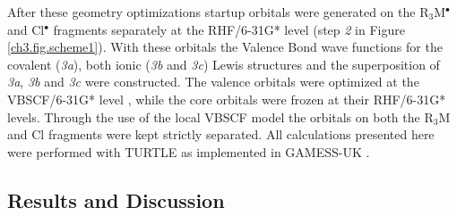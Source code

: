 After these geometry optimizations startup orbitals were generated on the R$_3$M$^{\bullet}$ and Cl$^{\bullet}$ fragments separately at the \mbox{RHF/6-31G*} level (step \textit{2} in Figure \ref{ch3.fig.scheme1}).  With these orbitals the Valence Bond wave functions for the covalent (\textit{3a}), both ionic (\textit{3b} and \textit{3c}) Lewis structures and the superposition of \textit{3a}, \textit{3b} and \textit{3c} were constructed. The valence orbitals were optimized at the \mbox{VBSCF/6-31G*} level \cite{vbscf1,vbscf2}, while the core orbitals were frozen at their \mbox{RHF/6-31G*} levels.
Through the use of the local VBSCF model the orbitals on both the R$_3$M and Cl fragments were kept strictly separated. All calculations presented here were performed with TURTLE \cite{turtle} as implemented in GAMESS-UK \cite{gamess}.

\subsection{Results and Discussion}

